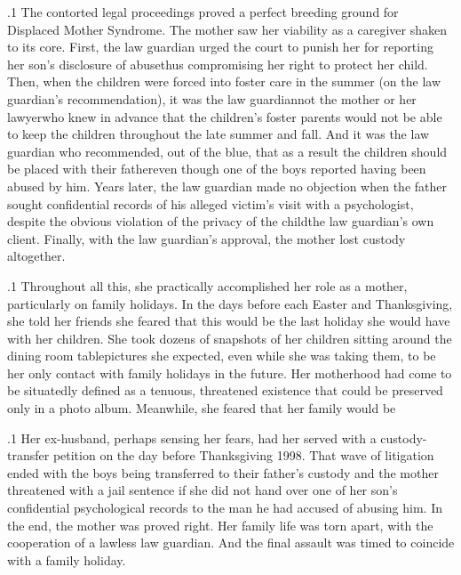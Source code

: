 \documentclass[11pt, twoside]{article}
\begin{document}
{\p.1{%
The contorted legal proceedings proved a perfect breeding ground
for Displaced Mother Syndrome. The mother saw her viability as a
caregiver shaken to its core. First, the law guardian urged the court to punish
her for reporting her son’s disclosure of abuse\mdash{}thus compromising her
right to protect her child. Then, when the children were forced into foster care in the summer (on the law guardian’s recommendation), it was
the law guardian\mdash{}not the mother or her lawyer\mdash{}who knew in advance
that the children’s foster parents would not be able to keep the children
throughout the late summer and fall. And it was the law guardian who
recommended, out of the blue, that as a result the children should be
placed with their father\mdash{}even though one of the boys reported having
been abused by him. Years later, the law guardian made no objection
when the father sought confidential records of his alleged victim’s visit
with a psychologist, despite the obvious violation of the privacy of the
child\mdash{}the law guardian’s own client. Finally, with the law guardian’s
approval, the mother lost custody altogether.
}%

\p.1{%
Throughout all this, she practically accomplished her role as a  mother, particularly on family holidays. In the days before each
Easter and Thanksgiving, she told her friends she feared that this would
be the last holiday she would have with her children. She took dozens
of snapshots of her children sitting around the dining room
table\mdash{}pictures she expected, even while she was taking them, to be her only
contact with family holidays in the future. Her motherhood had come
to be situatedly defined as a tenuous, threatened existence that could
be preserved only in a photo album. Meanwhile, she feared that her
family would be 
}%

\p.1{%
Her ex-husband, perhaps sensing her fears, had her served with a
custody-transfer petition on the day before Thanksgiving 1998. That
wave of litigation ended with the boys being transferred to their father’s custody and the mother threatened with a jail sentence if she did
not hand over one of her son’s confidential psychological records to the
man he had accused of abusing him. In the end, the mother was proved
right. Her family life was torn apart, with the cooperation of a lawless
law guardian. And the final assault was timed to coincide with a family
holiday.
}%


}
\end{document}

